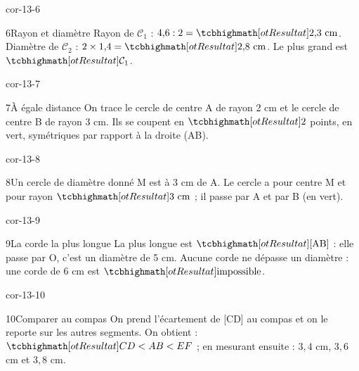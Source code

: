\begin{blocLivre}{cor-13-6}\begin{corrige}{6}{Rayon et diamètre}
Rayon de $\mathcal C_1$ : $4{,}6:2=\res{2{,}3\ \mathrm{cm}}$. Diamètre de $\mathcal C_2$ : $2\times1{,}4=\res{2{,}8\ \mathrm{cm}}$. Le plus grand est $\res{\mathcal C_1}$.
\label{fig-cor-13-6}
\end{corrige}\end{blocLivre}
\begin{blocLivre}{cor-13-7}\begin{corrige}{7}{À égale distance}
On trace le cercle de centre A de rayon 2 cm et le cercle de centre B de rayon 3 cm. Ils se coupent en $\res2$ points, en vert, symétriques par rapport à la droite (AB).
\label{fig-cor-13-7}
\end{corrige}\end{blocLivre}
\begin{blocLivre}{cor-13-8}\begin{corrige}{8}{Un cercle de diamètre donné}
M est à 3 cm de A. Le cercle a pour centre M et pour rayon $\res{3\ \mathrm{cm}}$ ; il passe par A et par B (en vert).
\label{fig-cor-13-8}
\end{corrige}\end{blocLivre}
\begin{blocLivre}{cor-13-9}\begin{corrige}{9}{La corde la plus longue}
La plus longue est $\res{\text{[AB]}}$ : elle passe par O, c’est un diamètre de 5 cm. Aucune corde ne dépasse un diamètre : une corde de 6 cm est $\res{\text{impossible}}$.
\label{fig-cor-13-9}
\end{corrige}\end{blocLivre}
\begin{blocLivre}{cor-13-10}\begin{corrige}{10}{Comparer au compas}
On prend l’écartement de [CD] au compas et on le reporte sur les autres segments. On obtient : $\res{CD<AB<EF}$ ; en mesurant ensuite : $3{,}4$ cm, $3{,}6$ cm et $3{,}8$ cm.
\label{fig-cor-13-10}
\end{corrige}\end{blocLivre}
